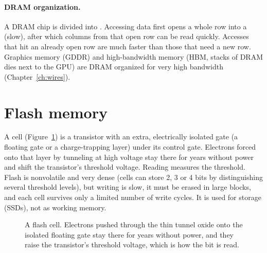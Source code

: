 \paragraph{DRAM organization.} A DRAM chip is divided into . Accessing data first opens a whole row into a  (slow), after which columns from that open row can be read quickly. Accesses that hit an already open row are much faster than those that need a new row. Graphics memory (GDDR) and high-bandwidth memory (HBM, stacks of DRAM dies next to the GPU) are DRAM organized for very high bandwidth (Chapter~\ref{ch:wires}).

\section{Flash memory}

A  cell (Figure~\ref{fig:flash}) is a transistor with an extra, electrically isolated gate (a floating gate or a charge-trapping layer) under its control gate. Electrons forced onto that layer by tunneling at high voltage stay there for years without power and shift the transistor's threshold voltage. Reading measures the threshold. Flash is nonvolatile and very dense (cells can store 2, 3 or 4 bits by distinguishing several threshold levels), but writing is slow, it must be erased in large blocks, and each cell survives only a limited number of write cycles. It is used for storage (SSDs), not as working memory.

\begin{figure}[h]
\centering
{}
\caption{A flash cell. Electrons pushed through the thin tunnel oxide onto the isolated floating gate stay there for years without power, and they raise the transistor's threshold voltage, which is how the bit is read.}
\label{fig:flash}
\end{figure}

